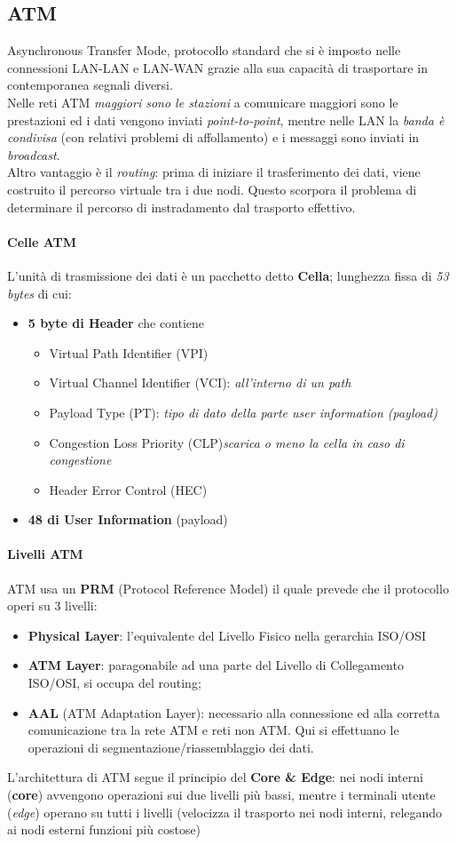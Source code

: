 \documentclass[a4paper,11pt]{article}
\def\italic#1{\textit{#1}}
\begin{document}
\subsection{ATM}
Asynchronous Transfer Mode, protocollo standard che si è imposto nelle  connessioni LAN-LAN e LAN-WAN grazie alla sua capacità di trasportare in contemporanea segnali diversi.\\
Nelle reti ATM \textit{maggiori sono le stazioni} a comunicare maggiori sono le prestazioni ed i dati vengono inviati \textit{point-to-point}, mentre nelle LAN la \textit{banda è condivisa }(con relativi problemi di affollamento) e i messaggi sono inviati in \textit{broadcast}.\\
Altro vantaggio è il \textit{routing}: prima di iniziare il trasferimento dei dati, viene costruito il percorso virtuale tra i due nodi. Questo scorpora il problema di determinare il percorso di instradamento dal trasporto effettivo.
\paragraph{Celle ATM} L'unità di trasmissione dei dati è un pacchetto detto \textbf{Cella}; lunghezza fissa di \textit{53 bytes} di cui:
\begin{itemize}
\item\textbf{5 byte di Header} che contiene
\begin{itemize}
\item Virtual Path Identifier (VPI)
\item Virtual Channel Identifier (VCI): \textit{all'interno di un path}
\item Payload Type (PT): \textit{tipo di dato della parte user information (payload)}
\item Congestion Loss Priority (CLP)\textit{scarica o meno la cella in caso di congestione}
\item Header Error Control (HEC)
\end{itemize}
\item\textbf{48 di User Information} (payload)
\end{itemize}
\paragraph{Livelli ATM} ATM usa un \textbf{PRM} (Protocol Reference Model) il quale prevede che il protocollo operi su 3 livelli:
\begin{itemize}
	\item \textbf{Physical Layer}: l'equivalente del Livello Fisico nella gerarchia ISO/OSI
	\item \textbf{ATM Layer}: paragonabile ad una parte del Livello di Collegamento ISO/OSI, si occupa del routing;
	\item \textbf{AAL} (ATM Adaptation Layer): necessario alla connessione ed alla corretta comunicazione tra la rete ATM e reti non ATM. Qui si effettuano le operazioni di segmentazione/riassemblaggio dei dati.
\end{itemize}
L'architettura di ATM segue il principio del \textbf{Core \& Edge}: nei nodi interni (\textbf{core}) avvengono operazioni sui due livelli più bassi, mentre i terminali utente (\italic{edge}) operano su tutti i livelli (velocizza il trasporto nei nodi interni, relegando ai nodi esterni funzioni più costose)
\end{document}
